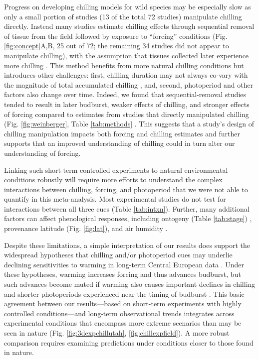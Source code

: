\documentclass{article}
\newcommand{\R}[1]{\label{#1}\linelabel{#1}}
\begin{document}
\par Progress on developing chilling models for wild species may be especially slow as only a small portion of studies (13 of the total 72 studies) manipulate chilling directly. Instead many studies estimate chilling effects through sequential removal of tissue from the field followed by exposure to ``forcing'' conditions (Fig. \ref{fig:concept}A,B, 25 out of 72; the remaining 34 studies did not appear to manipulate chilling), with the assumption that tissues collected later experience more chilling \emph{\citep{weinberger1950}}. This method benefits from more natural chilling conditions but introduces other challenges: first, chilling duration may not always co-vary with the magnitude of total accumulated chilling \emph{\citep{dennis2003}}, and, second, photoperiod and other factors also change over time. Indeed, we found that sequential-removal studies tended to result in later budburst, weaker effects of chilling, and stronger effects of forcing compared to estimates from studies that directly manipulated chilling (Fig. \ref{fig:weinberger}, Table \ref{tab:methods} \emph{\citep{weinberger1950,polgar2013}}. This suggests that a study's design of chilling manipulation impacts both forcing and chilling estimates and further supports that an improved understanding of chilling could in turn alter our understanding of forcing. 

\par Linking such short-term controlled experiments to natural environmental conditions robustly will require more efforts to understand the complex interactions between chilling, forcing, and photoperiod that we were not able to quantify in this meta-analysis. Most experimental studies do not test for interactions between all three cues (Table \ref{tab:intxn}). Further, many additional factors can affect phenological responses, including ontogeny (Table \ref{tab:stage}) \emph{\citep[][]{vitasse2013ont}}, provenance latitude (Fig. \ref{fig:lat}), and air humidity \emph{\citep{Laube:2014b}}. 

\par Despite these limitations, a simple interpretation of our results does support the widespread hypotheses that chilling and/or photoperiod cues may underlie declining sensitivities to warming in long-term Central European data \emph{\citep{fu2015,Rutishauser:2008,yu2010}}. Under these hypotheses, warming increases forcing and thus advances budburst, but such advances become muted if warming also causes important declines in chilling and shorter photoperiods experienced near the timing of budburst \emph{\citep{gauzere2019}}. This basic agreement between our results---based on short-term \R{ee8}experiments with highly controlled conditions---and long-term observational trends integrates across experimental conditions that encompass more extreme scenarios than may be seen in nature (Fig. \ref{fig:3dexpchillutah}, \ref{fig:chillexpfield}). A more robust comparison requires examining predictions under conditions closer to those found in nature.
\end{document}

